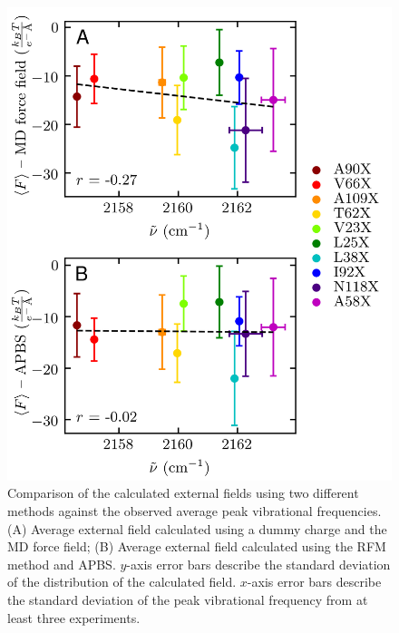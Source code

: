 \begin{figure}
    \center
    \includegraphics[width=\single]{figures-snase/combined_external_fields_figure.png}
    \caption[Calculated external fields against the observed vibrational frequencies]{
        Comparison of the calculated external fields using two different methods against the observed average peak vibrational frequencies. 
        (A) Average external field calculated using a dummy charge and the MD force field; 
        (B) Average external field calculated using the RFM method and APBS. 
        $y$-axis error bars describe the standard deviation of the distribution of the calculated field. 
        $x$-axis error bars describe the standard deviation of the peak vibrational frequency from at least three experiments.
    }
    \label{fig:snase-external}
\end{figure}

